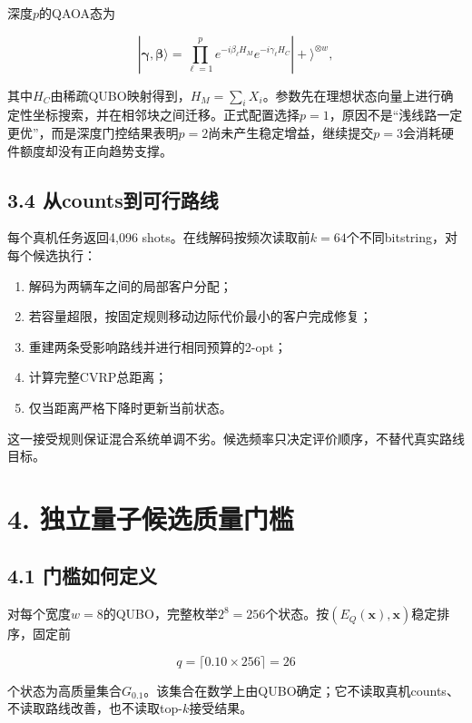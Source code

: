 \documentclass[
  10.5pt,
  UTF8]{ctexart}
\providecommand{\tightlist}{%
  \setlength{\itemsep}{0pt}\setlength{\parskip}{0pt}}
\begin{document}
深度\(p\)的QAOA态为

\[
|\boldsymbol{\gamma},\boldsymbol{\beta}\rangle=
\prod_{\ell=1}^{p}e^{-i\beta_\ell H_M}e^{-i\gamma_\ell H_C}|+\rangle^{\otimes w},
\]

其中\(H_C\)由稀疏QUBO映射得到，\(H_M=\sum_i X_i\)。参数先在理想状态向量上进行确定性坐标搜索，并在相邻块之间迁移。正式配置选择\(p=1\)，原因不是``浅线路一定更优''，而是深度门控结果表明\(p=2\)尚未产生稳定增益，继续提交\(p=3\)会消耗硬件额度却没有正向趋势支撑。

\subsection{3.4 从counts到可行路线}\label{ux4ececountsux5230ux53efux884cux8defux7ebf}

每个真机任务返回4,096 shots。在线解码按频次读取前\(k=64\)个不同bitstring，对每个候选执行：

\begin{enumerate}
\def\labelenumi{\arabic{enumi}.}
\tightlist
\item
  解码为两辆车之间的局部客户分配；
\item
  若容量超限，按固定规则移动边际代价最小的客户完成修复；
\item
  重建两条受影响路线并进行相同预算的2-opt；
\item
  计算完整CVRP总距离；
\item
  仅当距离严格下降时更新当前状态。
\end{enumerate}

这一接受规则保证混合系统单调不劣。候选频率只决定评价顺序，不替代真实路线目标。

\section{4. 独立量子候选质量门槛}\label{ux72ecux7acbux91cfux5b50ux5019ux9009ux8d28ux91cfux95e8ux69db}

\subsection{4.1 门槛如何定义}\label{ux95e8ux69dbux5982ux4f55ux5b9aux4e49}

对每个宽度\(w=8\)的QUBO，完整枚举\(2^8=256\)个状态。按\((E_Q(\mathbf{x}),\mathbf{x})\)稳定排序，固定前

\[
q=\lceil 0.10\times 256\rceil=26
\]

个状态为高质量集合\(G_{0.1}\)。该集合在数学上由QUBO确定；它不读取真机counts、不读取路线改善，也不读取top-\(k\)接受结果。
\end{document}
